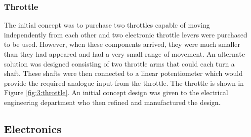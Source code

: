 		\subsubsection{Throttle}
		The initial concept was to purchase two throttles capable of moving independently from each other and two electronic throttle levers were purchased to be used. However, when these components arrived, they were much smaller than they had appeared and had a very small range of movement. An alternate solution was designed consisting of two throttle arms that could each turn a shaft. These shafts were then connected to a linear potentiometer which would provide the required analogue input from the throttle. The throttle is shown in Figure \ref{fig:3:throttle}. An initial concept design was given to the electrical engineering department who then refined and manufactured the design. 
		\par
	\subsection{Electronics}\par
		
